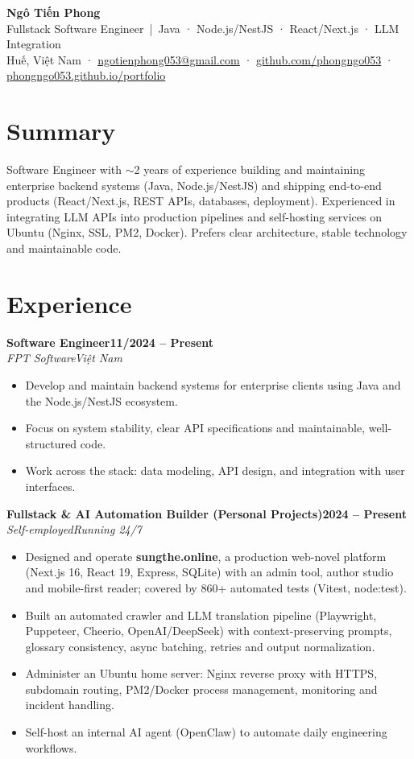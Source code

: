\documentclass[10pt,a4paper]{article}
\newcommand{\entry}[4]{\textbf{#1}\hfill\textbf{#2}\\ \textit{#3}\hfill\textit{#4}\par\vspace{1pt}}
\begin{document}
\begin{center}
  {\Huge\bfseries Ngô Tiến Phong}\\[3pt]
  {\large\color{accent} Fullstack Software Engineer \,|\, Java · Node.js/NestJS · React/Next.js · LLM Integration}\\[4pt]
  Huế, Việt Nam \;·\; \href{mailto:ngotienphong053@gmail.com}{ngotienphong053@gmail.com} \;·\;
  \href{https://github.com/phongngo053}{github.com/phongngo053} \;·\;
  \href{https://phongngo053.github.io/portfolio/}{phongngo053.github.io/portfolio}
\end{center}

\section{Summary}
Software Engineer with $\sim$2 years of experience building and maintaining enterprise backend systems (Java, Node.js/NestJS) and shipping end-to-end products (React/Next.js, REST APIs, databases, deployment). Experienced in integrating LLM APIs into production pipelines and self-hosting services on Ubuntu (Nginx, SSL, PM2, Docker). Prefers clear architecture, stable technology and maintainable code.

\section{Experience}
\entry{Software Engineer}{11/2024 -- Present}{FPT Software}{Việt Nam}
\begin{itemize}
  \item Develop and maintain backend systems for enterprise clients using Java and the Node.js/NestJS ecosystem.
  \item Focus on system stability, clear API specifications and maintainable, well-structured code.
  \item Work across the stack: data modeling, API design, and integration with user interfaces.
\end{itemize}

\vspace{4pt}
\entry{Fullstack \& AI Automation Builder (Personal Projects)}{2024 -- Present}{Self-employed}{Running 24/7}
\begin{itemize}
  \item Designed and operate \textbf{sungthe.online}, a production web-novel platform (Next.js 16, React 19, Express, SQLite) with an admin tool, author studio and mobile-first reader; covered by 860+ automated tests (Vitest, node:test).
  \item Built an automated crawler and LLM translation pipeline (Playwright, Puppeteer, Cheerio, OpenAI/DeepSeek) with context-preserving prompts, glossary consistency, async batching, retries and output normalization.
  \item Administer an Ubuntu home server: Nginx reverse proxy with HTTPS, subdomain routing, PM2/Docker process management, monitoring and incident handling.
  \item Self-host an internal AI agent (OpenClaw) to automate daily engineering workflows.
\end{itemize}
\end{document}
